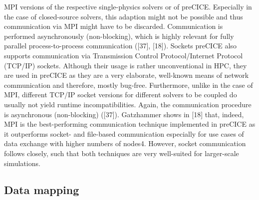 MPI versions of the respective single-physics solvers or of preCICE. Especially in the case of closed-source
solvers, this adaption might not be possible and thus communication via MPI might have to be discarded.
Communication is performed asynchronously (non-blocking), which is highly relevant for fully parallel
process-to-process communication ([37], [18]).
Sockets
preCICE also supports communication via Transmission Control Protocol/Internet Protocol (TCP/IP)
sockets. Although their usage is rather unconventional in HPC, they are used in preCICE as they are
a very elaborate, well-known means of network communication and therefore, mostly bug-free. Furthermore,
unlike in the case of MPI, different TCP/IP socket versions for different solvers to be coupled
do usually not yield runtime incompatibilities. Again, the communication procedure is asynchronous
(non-blocking) ([37]).
Gatzhammer shows in [18] that, indeed, MPI is the best-performing communication technique implemented
in preCICE as it outperforms socket- and file-based communication especially for use cases of
data exchange with higher numbers of nodes4. However, socket communication follows closely, such that
both techniques are very well-suited for larger-scale simulations.

\subsection{Data mapping}
\label{sec:pc-map}

